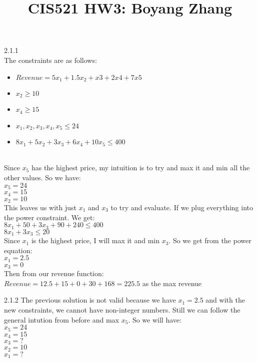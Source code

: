 \documentclass[11pt,letterpaper]{article}
\title{CIS521 HW3: Boyang Zhang} \date{}
\begin{document}
\maketitle

\vspace{-30pt}


\begin{description}
\item{2.1.1}\\
The constraints are as follows:
\begin{itemize}
\item $Revenue = 5x_{1} + 1.5x_{2} + x{3} + 2x{4} + 7x{5}$
\item $x_{2} \ge 10$
\item $x_4 \ge 15$
\item $x_1, x_2, x_3 , x_4, x_5 \le 24$
\item $8x_1 + 5x_2 + 3x_3 + 6x_4 + 10x_5 \le 400$
\end{itemize}\\
Since $x_5$ has the highest price, my intuition is to try and max it
and min all the other values.  So we have:\\
$x_5 = 24$\\
$x_4 = 15$\\
$x_2 = 10$\\

This leaves us with just $x_1$ and $x_3$ to try and evaluate.
If we plug everything into the power constraint.  We get:\\
$8x_1 + 50 + 3x_3 + 90 + 240 \le 400$\\
$8x_1 + 3x_3 \le 20$\\
Since $x_1$ is the highest price, I will max it and min $x_3$. So we
get from the power equation:\\
$x_1 = 2.5$\\
$x_3 = 0$\\

Then from our revenue function:\\
$Revenue = 12.5 + 15 + 0 + 30 + 168 = 225.5$ as the max revenue\\
\item{2.1.2}
The previous solution is not valid because we have $x_1 = 2.5$ and
with the new constraints, we cannot have non-integer numbers.  Still
we can follow the general intution from before and max $x_5$. So we
will have:\\
$x_5 = 24$\\
$x_4 = 15$\\
$x_3 = ?$\\
$x_2 = 10$\\
$x_1 = ?$\\


\end{description}
\end{document}
